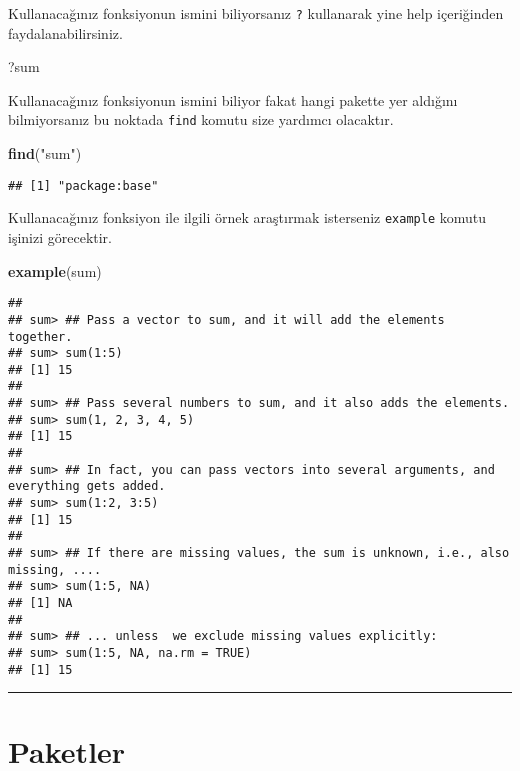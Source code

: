 \documentclass[
]{book}
\newenvironment{Shaded}{\begin{snugshade}}{\end{snugshade}}
\newcommand{\KeywordTok}[1]{\textcolor[rgb]{0.13,0.29,0.53}{\textbf{#1}}}
\newcommand{\NormalTok}[1]{#1}
\newcommand{\StringTok}[1]{\textcolor[rgb]{0.31,0.60,0.02}{#1}}
\begin{document}
Kullanacağınız fonksiyonun ismini biliyorsanız \texttt{?} kullanarak yine help içeriğinden faydalanabilirsiniz.

\begin{Shaded}
\begin{Highlighting}[]
\NormalTok{?sum}
\end{Highlighting}
\end{Shaded}

Kullanacağınız fonksiyonun ismini biliyor fakat hangi pakette yer aldığını bilmiyorsanız bu noktada \texttt{find} komutu size yardımcı olacaktır.

\begin{Shaded}
\begin{Highlighting}[]
\KeywordTok{find}\NormalTok{(}\StringTok{"sum"}\NormalTok{)}
\end{Highlighting}
\end{Shaded}

\begin{verbatim}
## [1] "package:base"
\end{verbatim}

Kullanacağınız fonksiyon ile ilgili örnek araştırmak isterseniz \texttt{example} komutu işinizi görecektir.

\begin{Shaded}
\begin{Highlighting}[]
\KeywordTok{example}\NormalTok{(sum)}
\end{Highlighting}
\end{Shaded}

\begin{verbatim}
## 
## sum> ## Pass a vector to sum, and it will add the elements together.
## sum> sum(1:5)
## [1] 15
## 
## sum> ## Pass several numbers to sum, and it also adds the elements.
## sum> sum(1, 2, 3, 4, 5)
## [1] 15
## 
## sum> ## In fact, you can pass vectors into several arguments, and everything gets added.
## sum> sum(1:2, 3:5)
## [1] 15
## 
## sum> ## If there are missing values, the sum is unknown, i.e., also missing, ....
## sum> sum(1:5, NA)
## [1] NA
## 
## sum> ## ... unless  we exclude missing values explicitly:
## sum> sum(1:5, NA, na.rm = TRUE)
## [1] 15
\end{verbatim}

\begin{center}\rule{0.5\linewidth}{0.5pt}\end{center}

\hypertarget{paketler}{%
\section{Paketler}\label{paketler}}
\end{document}
